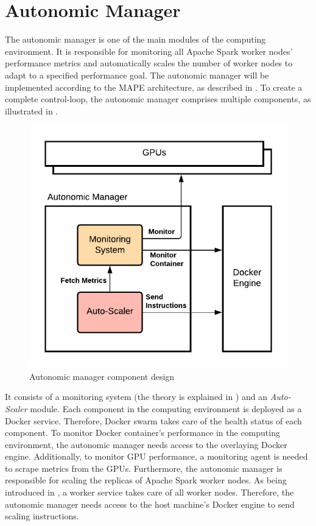 \section{Autonomic Manager}
\label{05_am}
The autonomic manager is one of the main modules of the computing environment.
It is responsible for monitoring all Apache Spark worker nodes' performance metrics and automatically scales the number of worker nodes to adapt to a specified performance goal.
The autonomic manager will be implemented according to the MAPE architecture, as described in . To create a complete control-loop, the autonomic manager comprises multiple components, as illustrated in .
\label{subsec:05_am}
\begin{figure}[h]
\centering
\includegraphics[scale=1]{images/05_conceptual_design/autonomic_manager/autonomic_manager_concept}
\caption{Autonomic manager component design}
\label{fig:05_am_concept}
\end{figure}
It consists of a monitoring system (the theory is explained in ) and an \textit{Auto-Scaler} module.
Each component in the computing environment is deployed as a Docker service. Therefore, Docker swarm takes care of the health status of each component.
To monitor Docker container's performance in the computing environment, the autonomic manager needs access to the overlaying Docker engine. Additionally, to monitor GPU performance, a monitoring agent is needed to scrape metrics from the GPUs.
Furthermore, the autonomic manager is responsible for scaling the replicas of Apache Spark worker nodes. As being introduced in , a worker service takes care of all worker nodes. Therefore, the autonomic manager needs access to the host machine's Docker engine to send scaling instructions.


